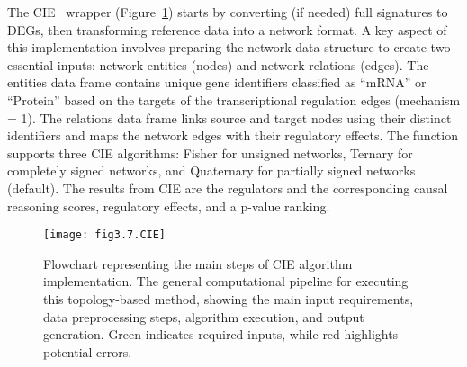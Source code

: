 The \gls{CIE}~\cite{RN81} wrapper (Figure~\ref{fig:fig3.7.CIE}) starts by converting (if needed) full signatures to DEGs, then transforming reference data into a network format. A key aspect of this implementation involves preparing the network data structure to create two essential inputs: network entities (nodes) and network relations (edges). The entities data frame contains unique gene identifiers classified as “mRNA” or “Protein” based on the targets of the transcriptional regulation edges (mechanism = 1). The relations data frame links source and target nodes using their distinct identifiers and maps the network edges with their regulatory effects. The function supports three CIE algorithms: Fisher for unsigned networks, Ternary for completely signed networks, and Quaternary for partially signed networks (default). The results from CIE are the regulators and the corresponding causal reasoning scores, regulatory effects, and a p-value ranking.


\begin{figure}[htbp]
    \centering
    \texttt{[image: fig3.7.CIE]}
    \caption{Flowchart representing the main steps of CIE algorithm implementation. The general computational pipeline for executing this topology-based method, showing the main input requirements, data preprocessing steps, algorithm execution, and output generation. Green indicates required inputs, while red highlights potential errors.}
    \label{fig:fig3.7.CIE}
\end{figure}

